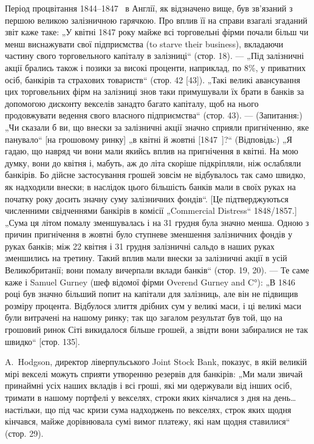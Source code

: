 Період процвітання 1844--1847~ в Англії, як відзначено вище, був зв’язаний
з першою великою залізничною гарячкою. Про вплив її на справи взагалі згаданий звіт каже таке: „У
квітні 1847 року майже всі торговельні фірми почали
більш чи менш виснажувати свої підприємства (to starve their business), вкладаючи частину свого
торговельного капіталу в залізниці“ (стор. 18). — „Під залізничні акції брались також і позики за
високі проценти, наприклад, по 8\%,
у приватних осіб, банкірів та страхових товариств“ (стор. 42 [43]). „Такі великі
авансування цих торговельних фірм на залізниці знов таки примушували їх брати
в банків за допомогою дисконту векселів занадто багато капіталу, щоб на нього
продовжувати ведення свого власного підприємства“ (стор. 43). — (Запитання:) „Чи
сказали б ви, що внески за залізничні акції значно сприяли пригніченню, яке
панувало“ [на грошовому ринку] „в квітні й жовтні [1847~]?“ (Відповідь:) „Я гадаю, що навряд чи
вони мали якийсь вплив на пригнічення в квітні. На мою думку,
вони до квітня і, мабуть, аж до літа скоріше підкріпляли, ніж ослабляли банкірів.
Бо дійсне застосування грошей зовсім не відбувалось так само швидко, як надходили внески; в наслідок
цього більшість банків мали в своїх руках на початку
року досить значну суму залізничних фондів“. [Це підтверджуються численними
свідченнями банкірів в комісії „Commercial Distress“ 1848/1857.] „Сума ця літом
помалу зменшувалась і на 31 грудня була значно менша. Одною з причин
пригнічення в жовтні було ступневе зменшення залізничних фондів у руках
банків; між 22 квітня і 31 грудня залізничні сальдо в наших руках зменшились
на третину. Такий вплив мали внески за залізничні акції в усій Великобританії;
вони помалу вичерпали вклади банків“ (стор. 19, 20). — Те саме каже і Samuel
Gurney (шеф відомої фірми Overend Gurney and C°): „В 1846 році був значно
більший попит на капітали для залізниць, але він не підвищив розміру процента. Відбулося злиття
дрібних сум у великі маси, і ці великі маси були витрачені на нашому ринку; так що загалом результат
був той, що на грошовий
ринок Сіті викидалося більше грошей, а звідти вони забиралися не так
швидко“ [стор. 135].

A.~Hodgson, директор ліверпульського Joint Stock Bank, показує, в якій великій мірі векселі можуть
сприяти утворенню резервів для банкірів: „Ми мали
звичай принаймні  усіх наших вкладів і всі гроші, які ми одержували від
інших осіб, тримати в нашому портфелі у векселях, строки яких кінчалися
з дня на день\dots{} настільки, що під час кризи сума надходжень по векселях,
строк яких щодня кінчався, майже дорівнювала сумі вимог платежу, які нам
щодня ставилися“ (стор. 29).

